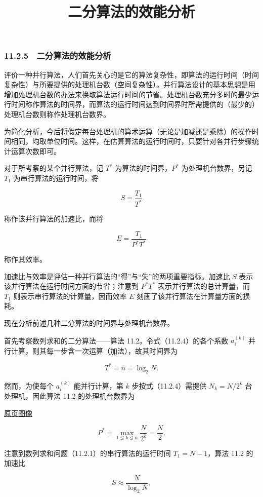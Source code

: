 \documentclass[
  10pt,
  fontset=fandol]{ctexart}
\title{二分算法的效能分析}
\author{}
\date{}
\begin{document}
\maketitle

\subsubsection{11.2.5　二分算法的效能分析}\label{ux4e8cux5206ux7b97ux6cd5ux7684ux6548ux80fdux5206ux6790}

评价一种并行算法，人们首先关心的是它的算法复杂性，即算法的运行时间（时间复杂性）与所要提供的处理机台数（空间复杂性）。并行算法设计的基本思想是用增加处理机台数的办法来换取算法运行时间的节省。处理机台数充分多时的最少运行时间称作算法的时间界，而算法的运行时间达到时间界时所需提供的（最少的）处理机台数则称作处理机台数界。

为简化分析，今后将假定每台处理机的算术运算（无论是加减还是乘除）的操作时间相同，均取单位时间。这样，在估算算法的运行时间时，只要针对各并行步骤统计运算次数即可。

对于所考察的某个并行算法，记 \(T^*\) 为算法的时间界，\(P^*\) 为处理机台数界，另记 \(T_1\) 为串行算法的运行时间，将

\[
S=\frac{T_1}{T^*}
\]

称作该并行算法的加速比，而将

\[
E=\frac{T_1}{P^*T^*}
\]

称作其效率。

加速比与效率是评估一种并行算法的``得''与``失''的两项重要指标。加速比 \(S\) 表示该并行算法在运行时间方面的节省；注意到 \(P^*T^*\) 表示并行算法的总计算量，而 \(T_1\) 则表示串行算法的计算量，因而效率 \(E\) 刻画了该并行算法在计算量方面的损耗。

现在分析前述几种二分算法的时间界与处理机台数界。

首先考察数列求和的二分算法------算法 11.2。令式（11.2.4）的各个系数 \(a_i^{(k)}\) 并行计算，则其每一步含一次运算（加法），故其时间界为

\[
T^*=n=\log_2 N.
\]

然而，为使每个 \(a_i^{(k)}\) 能并行计算，第 \(k\) 步按式（11.2.4）需提供 \(N_k=N/2^k\) 台处理机，因此算法 11.2 的处理机台数界为

\href{../../source-images/pdf-284.jpeg}{原页图像}

\[
P^*=\max_{1\le k\le n}\frac{N}{2^k}=\frac{N}{2}.
\]

注意到数列求和问题（11.2.1）的串行算法的运行时间 \(T_1=N-1\)，算法 11.2 的加速比

\[
S\approx\frac{N}{\log_2 N},
\]
\end{document}
